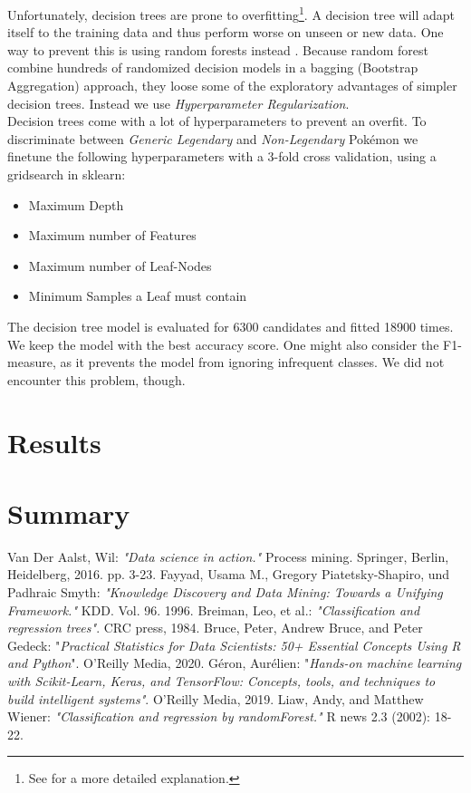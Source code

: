 \documentclass[conference]{IEEEtran}
\begin{document}
Unfortunately, decision trees are prone to overfitting\footnote{See \cite[pp. 184]{aurelien19} for a more detailed explanation.}. A decision tree will adapt itself to the training data and thus perform worse on unseen or new data. One way to prevent this is using random forests instead \cite{liaw02}. Because random forest combine hundreds of randomized decision models in a bagging (Bootstrap Aggregation) approach, they loose some of the exploratory advantages of simpler decision trees. Instead we use \textit{Hyperparameter Regularization}.\\
Decision trees come with a lot of hyperparameters to prevent an overfit. To discriminate between \textit{Generic Legendary} and \textit{Non-Legendary} Pokémon we finetune the following hyperparameters with a $3$-fold cross validation, using a gridsearch in sklearn:
\begin{itemize}
	\item Maximum Depth
	\item Maximum number of Features
	\item Maximum number of Leaf-Nodes
	\item Minimum Samples a Leaf must contain
\end{itemize}
The decision tree model is evaluated for 6300 candidates and fitted 18900 times. We keep the model with the best accuracy score. One might also consider the F1-measure, as it prevents the model from ignoring infrequent classes. We did not encounter this problem, though.

\section{Results}

\section{Summary}

\begin{thebibliography}{00}
 Van Der Aalst, Wil: {\em "Data science in action."} Process mining. Springer, Berlin, Heidelberg, 2016. pp. 3-23.
Fayyad, Usama M., Gregory Piatetsky-Shapiro, und Padhraic Smyth: {\em "Knowledge Discovery and Data Mining: Towards a Unifying Framework."} KDD. Vol. 96. 1996.
Breiman, Leo, et al.: {\em "Classification and regression trees"}. CRC press, 1984.
Bruce, Peter, Andrew Bruce, and Peter Gedeck: "{\em Practical Statistics for Data Scientists: 50+ Essential Concepts Using R and Python}". O'Reilly Media, 2020.
Géron, Aurélien: {"\em Hands-on machine learning with Scikit-Learn, Keras, and TensorFlow: Concepts, tools, and techniques to build intelligent systems"}. O'Reilly Media, 2019.
Liaw, Andy, and Matthew Wiener: {\em "Classification and regression by randomForest."} R news 2.3 (2002): 18-22.
\end{thebibliography}
\end{document}
